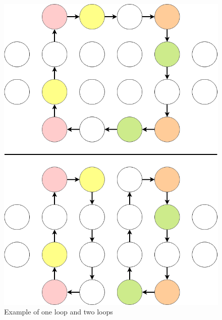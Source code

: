 \begin{figure}[H]
  \centering
  \caption{Example of one loop and two loops}\label{img:loyd_loop}
  \includegraphics[width=\widthimg]{img/loop_highway.drawio.png}
\end{figure}

                             
